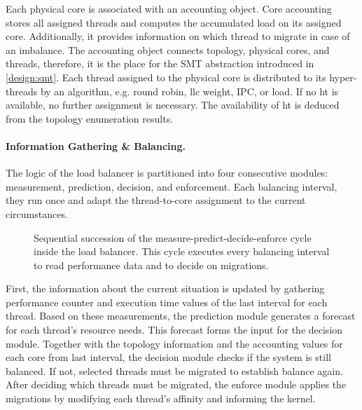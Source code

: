 Each physical core is associated with an accounting object.
Core accounting stores all assigned threads and computes the accumulated
load on its assigned core.
Additionally, it provides information on which thread to migrate in case of an
imbalance.
The accounting object connects topology, physical cores, and threads, therefore,
it is the place for the SMT abstraction introduced in \ref{design:smt}.
Each thread assigned to the physical core is distributed to its hyper-threads
by an algorithm, e.g. round robin, \gls{llc} weight, IPC, or load.
If no \gls{ht} is available, no further assignment is necessary.
The availability of \gls{ht} is deduced from the topology enumeration results.


\paragraph{Information Gathering \& Balancing.}
The logic of the load balancer is partitioned into four consecutive modules:
measurement, prediction, decision, and enforcement.
Each balancing interval, they run once and adapt the thread-to-core
assignment to the current circumstances.

\begin{figure}[h]
  \setcapindent*{1em}
  \begin{captionbeside}
    {Sequential succession of the measure-predict-decide-enforce cycle inside the load
    balancer. This cycle executes every balancing interval to read performance
    data and to decide on migrations.}
  
  \end{captionbeside}
  \label{arch:fig:intervalcycle}
\end{figure}

First, the information about the current situation is updated by gathering
performance counter and execution time values of the last interval for each
thread.
Based on these measurements, the prediction module generates a forecast for
each thread's resource needs.
This forecast forms the input for the decision module.
Together with the topology information and the accounting values for each core
from last interval, the decision module checks if the system is still balanced.
If not, selected threads must be migrated to establish balance again.
After deciding which threads must be migrated, the enforce module applies the
migrations by modifying each thread's affinity and informing the kernel.

